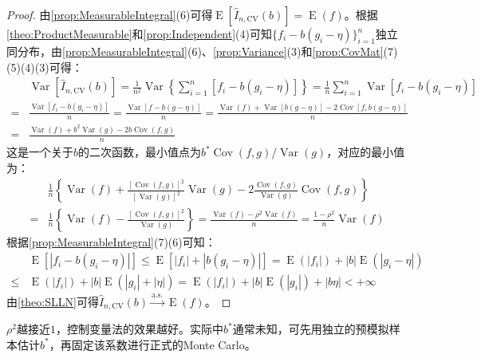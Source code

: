 \begin{proof}
	由\cref{prop:MeasurableIntegral}(6)可得$\operatorname{E}[\hat{I}_{n,\mathrm{CV}}(b)]=\operatorname{E}(f)$。根据\cref{theo:ProductMeasurable}和\cref{prop:Independent}(4)可知$\{f_i-b(g_i-\eta)\}_{i=1}^n$独立同分布，由\cref{prop:MeasurableIntegral}(6)、\cref{prop:Variance}(3)和\cref{prop:CovMat}(7)(5)(4)(3)可得：
	\begin{align*}
		&\operatorname{Var}[\hat{I}_{n,\mathrm{CV}}(b)]=\frac{1}{n^2}\operatorname{Var}\left\{\sum_{i=1}^{n}[f_i-b(g_i-\eta)]\right\}=\frac{1}{n}\sum_{i=1}^{n}\operatorname{Var}[f_i-b(g_i-\eta)] \\
		=&\frac{\operatorname{Var}[f_i-b(g_i-\eta)]}{n}=\frac{\operatorname{Var}[f-b(g-\eta)]}{n}=\frac{\operatorname{Var}(f)+\operatorname{Var}[b(g-\eta)]-2\operatorname{Cov}[f,b(g-\eta)]}{n} \\
		=&\frac{\operatorname{Var}(f)+b^2\operatorname{Var}(g)-2b\operatorname{Cov}(f,g)}{n}
	\end{align*}
	这是一个关于$b$的二次函数，最小值点为$b^*\operatorname{Cov}(f,g)/\operatorname{Var}(g)$，对应的最小值为：
	\begin{align*}
		&\frac{1}{n}\left\{\operatorname{Var}(f)+\frac{[\operatorname{Cov}(f,g)]^2}{[\operatorname{Var}(g)]^2}\operatorname{Var}(g)-2\frac{\operatorname{Cov}(f,g)}{\operatorname{Var}(g)}\operatorname{Cov}(f,g)\right\} \\
		=&\frac{1}{n}\left\{\operatorname{Var}(f)-\frac{[\operatorname{Cov}(f,g)]^2}{\operatorname{Var}(g)}\right\}=\frac{\operatorname{Var}(f)-\rho^2\operatorname{Var}(f)}{n}=\frac{1-\rho^2}{n}\operatorname{Var}(f)
	\end{align*}
	根据\cref{prop:MeasurableIntegral}(7)(6)可知：
	\begin{align*}
		&\operatorname{E}[|f_i-b(g_i-\eta)|]\leqslant\operatorname{E}[|f_i|+|b(g_i-\eta)|]=\operatorname{E}(|f_i|)+|b|\operatorname{E}(|g_i-\eta|) \\
		\leqslant&\operatorname{E}(|f_i|)+|b|\operatorname{E}(|g_i|+|\eta|)=\operatorname{E}(|f_i|)+|b|\operatorname{E}(|g_i|)+|b\eta|<+\infty
	\end{align*}
	由\cref{theo:SLLN}可得$\hat{I}_{n,\mathrm{CV}}(b)\overset{\text{a.s.}}{\longrightarrow}\operatorname{E}(f)$。
\end{proof}
$\rho^2$越接近$1$，控制变量法的效果越好。实际中$b^*$通常未知，可先用独立的预模拟样本估计$b^*$，再固定该系数进行正式的Monte Carlo。
